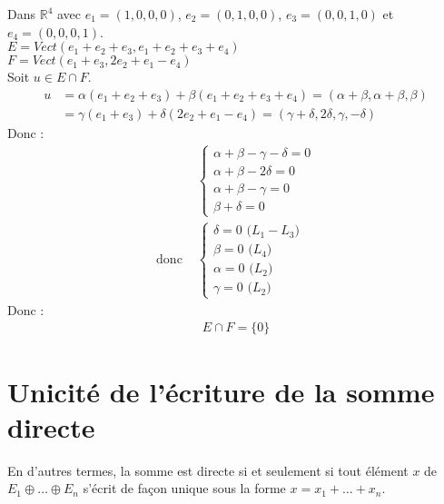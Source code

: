 \documentclass[../main.tex]{subfiles}
\begin{document}
\noindent Dans $\mathbb{R}^4$ avec $e_1 = (1, 0, 0, 0)$, $e_2 = (0, 1, 0, 0)$, $e_3 = (0, 0, 1, 0)$ et $e_4 = (0, 0, 0, 1)$. \\
$E = Vect(e_1 + e_2 + e_3, e_1 + e_2 + e_3 + e_4)$ \\
$F = Vect(e_1 + e_3, 2e_2 + e_1 - e_4)$ \\
Soit $u \in E \cap F$. \\
\begin{align*}
    u &= \alpha(e_1 + e_2 + e_3) + \beta(e_1 + e_2 + e_3 + e_4) = (\alpha + \beta, \alpha + \beta, \beta) \\
    &= \gamma(e_1 + e_3) + \delta(2e_2 + e_1 - e_4) = (\gamma + \delta, 2\delta, \gamma, -\delta)
\end{align*}
Donc : 
\begin{align*}
    &\begin{cases}
        \alpha + \beta - \gamma - \delta = 0 \\
        \alpha + \beta - 2\delta = 0 \\
        \alpha + \beta - \gamma = 0 \\
        \beta + \delta = 0
    \end{cases} \\
    \text{donc } 
    &\begin{cases}
        \delta = 0 \text{ ($L_1 - L_3$)} \\
        \beta = 0 \text{ ($L_4$)} \\
        \alpha = 0 \text{ ($L_2$)} \\
        \gamma = 0 \text{ ($L_2$)}
    \end{cases}
\end{align*}
Donc : 
\begin{align*}
    \boxed{E \cap F = \{0\}}
\end{align*}

\section{Unicité de l'écriture de la somme directe}
\begin{tcolorbox}[title=Remarque 20.47, title filled=false, colframe=lightblue, colback=lightblue!10!white]
    En d'autres termes, la somme est directe si et seulement si tout élément $x$ de $E_1 \oplus \ldots \oplus E_n$ s'écrit de façon unique sous la forme $x = x_1 + \ldots + x_n$. 
\end{tcolorbox}
\end{document}
